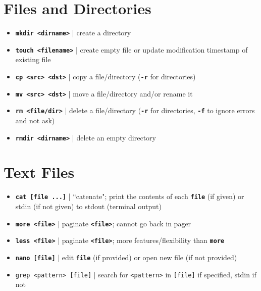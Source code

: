 \documentclass{article}
\newcommand{\cmd}[1]{\texttt{\textbf{#1}}}
\begin{document}
\begin{multicols}{2}
\section{Files and Directories}
\begin{itemize}
	\item \cmd{mkdir <dirname>} | create a directory
	\item \cmd{touch <filename>} | create empty file or update modification timestamp of existing file
	\item \cmd{cp <src> <dst>} | copy a file/directory (\cmd{-r} for directories)
	\item \cmd{mv <src> <dst>} | move a file/directory and/or rename it
	\item \cmd{rm <file/dir>} | delete a file/directory (\cmd{-r} for directories, \cmd{-f} to ignore errors and not ask)
	\item \cmd{rmdir <dirname>} | delete an empty directory
\end{itemize}

\section{Text Files}
\begin{itemize}
	\item \cmd{cat [file ...]} | ``catenate"; print the contents of each \cmd{file} (if given) or stdin (if not given) to stdout (terminal output)
	\item \cmd{more <file>} | paginate \cmd{<file>}; cannot go back in pager
	\item \cmd{less <file>} | paginate \cmd{<file>}; more features/flexibility than \cmd{more}
	\item \cmd{nano [file]} | edit \cmd{file} (if provided) or open new file (if not provided)
	\item \texttt{grep <pattern> [file]} | search for \texttt{<pattern>} in \texttt{[file]} if specified, stdin if not
\end{itemize}


\end{multicols}
\end{document}
